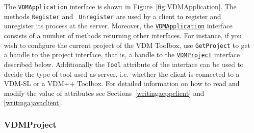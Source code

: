 \documentclass[\pformat,12pt]{article}
\newcommand{\VDMApplication}{\hyperlink{interface.VDMApplication}{VDMApplication}}
\newcommand{\VDMProject}{\hyperlink{interface.VDMProject}{VDMProject}}
\begin{document}

The {\tt \VDMApplication} interface is shown in
Figure~\ref{fig:VDMApplication}.  The methods {\tt Register} and {\tt
  Unregister} are used by a client to register and unregister its
process at the server.  Moreover, the {\tt \VDMApplication} interface
consists of a number of methods returning other interfaces. For
instance, if you wish to configure the current project of the VDM
Toolbox, use {\tt GetProject} to get a handle to the project
interface, that is, a handle to the {\tt \VDMProject} interface
described below. Additionally the {\tt Tool} attribute of the
interface can be used to decide the type of tool used as server, i.e.\
whether the client is connected to a VDM-SL or a VDM++ Toolbox.  For
detailed information on how to read and modify the value of attributes
see Sections~\ref{writingacppclient} and \ref{writingajavaclient}.
\subsubsection{VDMProject}
\end{document}
